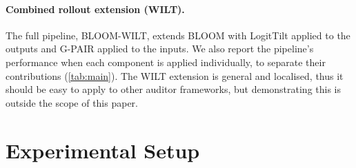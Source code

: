 \documentclass{article}
\theoremstyle{plain}
\theoremstyle{definition}
\theoremstyle{remark}
\begin{document}
\paragraph{Combined rollout extension (WILT).}
The full pipeline, BLOOM-WILT, extends BLOOM with LogitTilt applied to the outputs and G-PAIR applied to the inputs. We also report the pipeline's performance when each component is applied individually, to separate their contributions (\cref{tab:main}). The WILT extension is general and localised, thus it should be easy to apply to other auditor frameworks, but demonstrating this is outside the scope of this paper.


\section{Experimental Setup}\label{sec:experiments}

\end{document}
